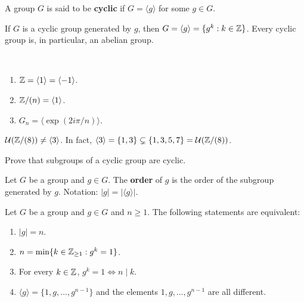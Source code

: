 \begin{definition}
        A group $G$ is said to be \textbf{cyclic} if 
        $G=\langle g\rangle$ for some 
        $g\in G$.
\end{definition}

If $G$ is a cyclic group generated by $g$, then 
$G=\langle g\rangle=\{g^k:k\in\mathbb{Z}\}$. Every cyclic group is, 
in particular, an abelian group. 

\begin{example}\
\begin{enumerate}
        \item $\mathbb{Z}=\langle 1\rangle=\langle -1\rangle$.
        \item $\mathbb{Z}/(n)=\langle 1\rangle$.
        \item $G_n=\langle \exp(2i\pi/n)\rangle$.
\end{enumerate}
\end{example}

\begin{example}
        $\mathcal{U}(\mathbb{Z}/(8))\ne\langle 3\rangle$. In fact, $\langle 3\rangle=\{1,3\}\subsetneq\{1,3,5,7\}=\mathcal{U}(\mathbb{Z}/(8))$.
\end{example}

\begin{exercise}
\label{xca:subgroups_cyclic}
        Prove that subgroups of a cyclic group are cyclic.
\end{exercise}

\begin{definition}
        Let $G$ be a group and $g\in G$. The \textbf{order} of $g$
        is the order of the subgroup generated by $g$. Notation:
        $|g|=|\langle g\rangle|$.
\end{definition}


\begin{theorem}
        Let $G$ be a group and $g\in G$ and $n\geq1$. 
        The following statements are equivalent:
        \begin{enumerate}
                \item $|g|=n$.
                \item $n=\min\{k\in\mathbb{Z}_{\geq1}:g^k=1\}$.
                \item For every $k\in\mathbb{Z}$, $g^k=1\Longleftrightarrow n\mid k$.
                \item $\langle g\rangle=\{1,g,\dots,g^{n-1}\}$ and 
                the elements $1,g,\dots,g^{n-1}$ are all different.
        \end{enumerate}
\end{theorem}



